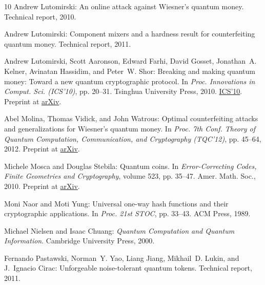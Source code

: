 \begin{thebibliography}{10}
{\sc Andrew Lutomirski}: An online attack against {W}iesner's quantum money.
\newblock Technical report, 2010.

{\sc Andrew Lutomirski}: Component mixers and a hardness result for
  counterfeiting quantum money.
\newblock Technical report, 2011.

{\sc Andrew Lutomirski, Scott Aaronson, Edward Farhi, David Gosset, Jonathan~A.
  Kelner, Avinatan Hassidim, and Peter~W. Shor}: Breaking and making quantum
  money: Toward a new quantum cryptographic protocol.
\newblock In {\em Proc. Innovations in Comput. Sci. (ICS'10)}, pp. 20--31.
  Tsinghua University Press, 2010.
\newblock
  \href{http://conference.itcs.tsinghua.edu.cn/ICS2010/papers.html}{ICS'10}.
  Preprint at \href{http://arxiv.org/abs/0912.3825}{arXiv}.

{\sc Abel Molina, Thomas Vidick, and John Watrous}: Optimal counterfeiting
  attacks and generalizations for {W}iesner's quantum money.
\newblock In {\em Proc. 7th Conf. Theory of Quantum Computation, Communication,
  and Cryptography (TQC'12)}, pp. 45--64, 2012.
\newblock Preprint at \href{http://arxiv.org/abs/1202.4010}{arXiv}.
\newblock [\epfmtdoi{10.1007/978-3-642-35656-8\_4}]

{\sc Michele Mosca and Douglas Stebila}: Quantum coins.
\newblock In {\em Error-Correcting Codes, Finite Geometries and Cryptography},
  volume 523, pp. 35--47. Amer. Math. Soc., 2010.
\newblock Preprint at \href{http://arxiv.org/abs/0911.1295}{arXiv}.

{\sc Moni Naor and Moti Yung}: Universal one-way hash functions and their
  cryptographic applications.
\newblock In {\em Proc. 21st STOC}, pp. 33--43. ACM Press, 1989.
\newblock [\epfmtdoi{10.1145/73007.73011}]

{\sc Michael Nielsen and Isaac Chuang}: {\em Quantum Computation and Quantum
  Information}.
\newblock Cambridge University Press, 2000.

{\sc Fernando Pastawski, Norman~Y. Yao, Liang Jiang, Mikhail~D. Lukin, and
  J.~Ignacio Cirac}: Unforgeable noise-tolerant quantum tokens.
\newblock Technical report, 2011.


\end{thebibliography}
